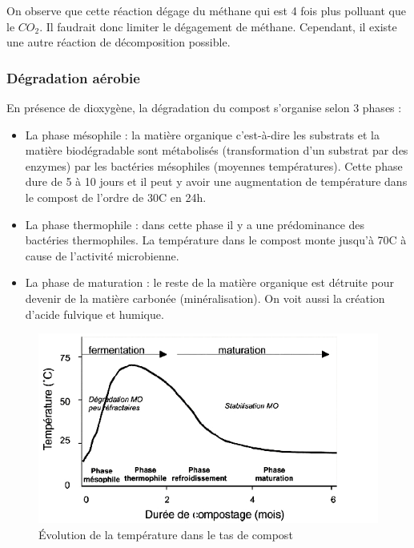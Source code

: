 \documentclass[../PS6_RapportFinal.tex]{subfiles}
\begin{document}
On observe que cette réaction dégage du méthane qui est 4 fois plus polluant que le \(CO_{2}\). Il faudrait donc limiter le dégagement de méthane. Cependant, il existe une autre réaction de décomposition possible.

\subsubsection{Dégradation aérobie}
En présence de dioxygène, la dégradation du compost s'organise selon 3 phases :
\begin{itemize}
\item La phase mésophile : la matière organique c'est-à-dire les substrats et la matière biodégradable sont métabolisés (transformation d’un substrat par des enzymes) par les bactéries mésophiles (moyennes températures). Cette phase dure de 5 à 10 jours et il peut y avoir une augmentation de température dans le compost de l’ordre de 30\degres C en 24h.

\item La phase thermophile : dans cette phase il y a une prédominance des bactéries thermophiles. La température dans le compost monte jusqu'à 70\degres C à cause de l’activité microbienne.

\item La phase de maturation : le reste de la matière organique est détruite pour devenir de la matière carbonée (minéralisation). On voit aussi la création d’acide fulvique et humique.
\end{itemize}
\vspace{3mm}

\begin{figure}[!h]
\begin{center}
\includegraphics[width=15cm]{1_1_2_evolutiontemperature.png}
\caption{Évolution de la température dans le tas de compost}
\end{center}
\end{figure}
\end{document}
